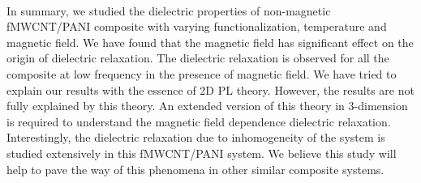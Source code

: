 \documentclass[journal=jaccck,manuscript=article]{achemso}
\begin{document}
\\ In summary, we studied the dielectric properties of non-magnetic fMWCNT/PANI composite with varying functionalization, temperature and magnetic field. We have found that the magnetic field has significant effect on the origin of dielectric relaxation. The dielectric relaxation is observed for all the composite at low frequency in the presence of magnetic field. We have tried to explain our results with the essence of 2D PL theory. However, the results are not fully explained by this theory. An extended version of this theory in 3-dimension is required to understand the magnetic field dependence dielectric relaxation. Interestingly, the dielectric relaxation due to inhomogeneity of the system is studied extensively in this fMWCNT/PANI system. We believe this study will help to pave the way of this phenomena in other similar composite systems.



\end{document}
